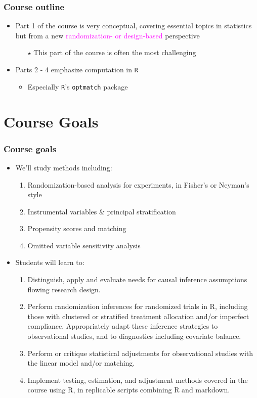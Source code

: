 \documentclass[table, xcolor = {dvipsnames}, 9pt]{beamer}
\theoremstyle{plain}
\begin{document}
\begin{frame}[t]
\frametitle{Course outline}
\vfill
\begin{itemize} \vfill
\item Part 1 of the course is very conceptual, covering essential topics in statistics but from a new \textcolor{magenta}{randomization- or design-based} perspective \vfill
\begin{itemize} \vfill
\item[$\star$] This part of the course is often the most challenging \vfill
\end{itemize} \vfill
\item Parts 2 - 4 emphasize computation in \texttt{R} \vfill
\begin{itemize} \vfill
\item Especially \texttt{R}'s \texttt{optmatch} package \vfill
\end{itemize} \vfill
\end{itemize} \vfill
\vfill
\end{frame}
\section{Course Goals}
\begin{frame}[t]
\frametitle{Course goals}
\vfill
\begin{itemize} \vfill
\item We'll study methods including:  \vfill
  \begin{enumerate}
    \item Randomization-based analysis for experiments, in Fisher's or
      Neyman's style\vfill
  \item Instrumental variables \& principal stratification  \vfill
  \item Propensity scores and matching  \vfill
  \item Omitted variable sensitivity analysis  \vfill
  \end{enumerate}
\item Students will learn to:
\begin{enumerate} \vfill
\item Distinguish, apply and evaluate needs for causal inference
  assumptions flowing research design.  \vfill
\item Perform randomization inferences for randomized trials in R,
  including those with clustered or stratified treatment allocation
  and/or imperfect compliance. Appropriately adapt these inference
  strategies to observational studies, and to diagnostics including
  covariate balance.\vfill
\item Perform or critique statistical adjustments for
  observational studies with the linear model and/or matching.\vfill
 \item Implement testing, estimation, and adjustment methods covered in the course using R, in replicable scripts combining R and markdown.
\end{enumerate} \vfill
\end{itemize} \vfill
\vfill
\end{frame}
\end{document}
